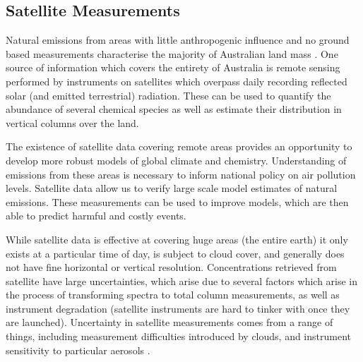   \subsection{Satellite Measurements}

    Natural emissions from areas with little anthropogenic influence and no ground based measurements characterise the majority of Australian land mass \citep{VanDerA2008}.
    One source of information which covers the entirety of Australia is remote sensing performed by instruments on satellites which overpass daily recording reflected solar (and emitted terrestrial) radiation.
    These can be used to quantify the abundance of several chemical species as well as estimate their distribution in vertical columns over the land.

    The existence of satellite data covering remote areas provides an opportunity to develop more robust models of global climate and chemistry.
    Understanding of emissions from these areas is necessary to inform national policy on air pollution levels.
    Satellite data allow us to verify large scale model estimates of natural emissions.
    These measurements can be used to improve models, which are then able to predict harmful and costly events.
    
    While satellite data is effective at covering huge areas (the entire earth) it only exists at a particular time of day, is subject to cloud cover, and generally does not have fine horizontal or vertical resolution.
    Concentrations retrieved from satellite have large uncertainties, which arise due to several factors which arise in the process of transforming spectra to total column measurements, as well as instrument degradation (satellite instruments are hard to tinker with once they are launched).
    Uncertainty in satellite measurements comes from a range of things, including measurement difficulties introduced by clouds, and instrument sensitivity to particular aerosols \citep{Millet2006}.
    
